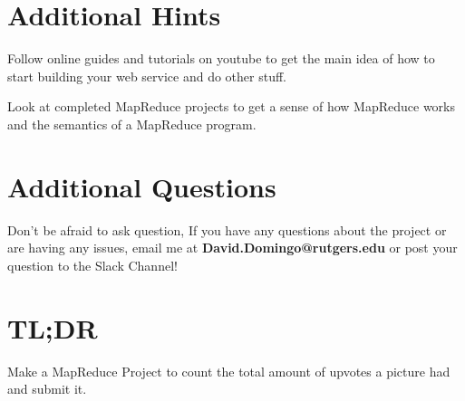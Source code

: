 \documentclass{article}
\begin{document}

\section*{Additional Hints} %
\begin{info}
Follow online guides and tutorials on youtube to get the main idea of how to start building your web service and do other stuff.
\end{info}
\begin{info}
Look at completed MapReduce projects to get a sense of how MapReduce works and the semantics of a MapReduce program.
\end{info}



\section*{Additional Questions} %
Don't be afraid to ask question, If you have any questions about the project or are having any issues, email me at \textbf{David.Domingo@rutgers.edu} or post your question to the Slack Channel!

\section*{TL;DR}
Make a MapReduce Project to count the total amount of upvotes a picture had and submit it. 

%
\end{document}
